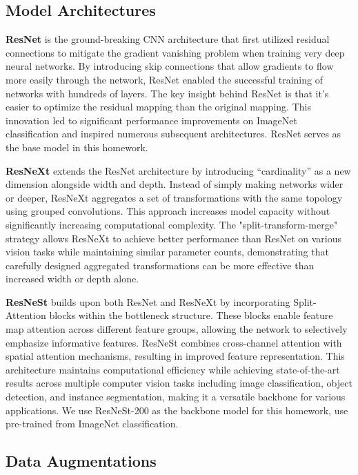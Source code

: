 \documentclass[twocolumn,a4paper]{article}
\begin{document}
\subsection{Model Architectures}
\textbf{ResNet}\cite{he2016deep} is the ground-breaking CNN architecture that first utilized residual connections to mitigate the gradient vanishing problem when training very deep neural networks. By introducing skip connections that allow gradients to flow more easily through the network, ResNet enabled the successful training of networks with hundreds of layers. The key insight behind ResNet is that it's easier to optimize the residual mapping than the original mapping. This innovation led to significant performance improvements on ImageNet classification and inspired numerous subsequent architectures. ResNet serves as the base model in this homework.

\textbf{ResNeXt}\cite{xie2017aggregated} extends the ResNet architecture by introducing ``cardinality'' as a new dimension alongside width and depth. Instead of simply making networks wider or deeper, ResNeXt aggregates a set of transformations with the same topology using grouped convolutions. This approach increases model capacity without significantly increasing computational complexity. The "split-transform-merge" strategy allows ResNeXt to achieve better performance than ResNet on various vision tasks while maintaining similar parameter counts, demonstrating that carefully designed aggregated transformations can be more effective than increased width or depth alone.

\textbf{ResNeSt}\cite{zhang2022resnest} builds upon both ResNet and ResNeXt by incorporating Split-Attention blocks within the bottleneck structure. These blocks enable feature map attention across different feature groups, allowing the network to selectively emphasize informative features. ResNeSt combines cross-channel attention with spatial attention mechanisms, resulting in improved feature representation. This architecture maintains computational efficiency while achieving state-of-the-art results across multiple computer vision tasks including image classification, object detection, and instance segmentation, making it a versatile backbone for various applications. We use ResNeSt-200 as the backbone model for this homework, use pre-trained from ImageNet classification.


\subsection{Data Augmentations}
\end{document}
